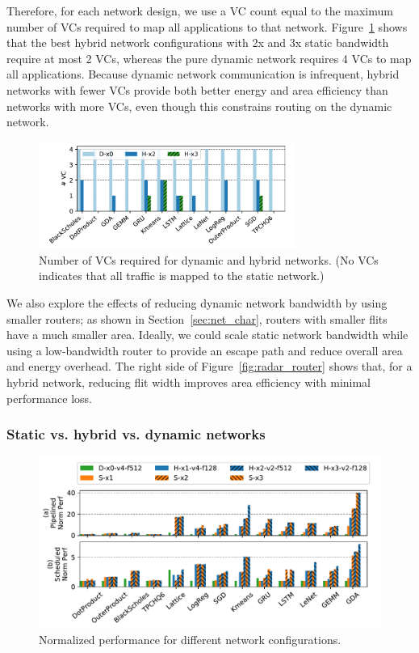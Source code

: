 Therefore, for each network design, we use a VC count equal to the maximum number of VCs required to map all applications to that network. 
Figure~\ref{fig:vc} shows that the best hybrid network configurations with 2x and 3x static bandwidth require at most 2 VCs, whereas the pure dynamic network requires 4 VCs to map all applications.
Because dynamic network communication is infrequent, hybrid networks with fewer VCs provide both better energy and area efficiency than networks with more VCs, even though this constrains routing on the dynamic network.

\begin{figure}
\centering
\includegraphics[width=0.75\textwidth]{network/figs/vc.pdf}
  \caption{Number of VCs required for dynamic and hybrid networks. (No VCs indicates that all traffic is mapped to the static network.)}\label{fig:vc}
\end{figure}

We also explore the effects of reducing dynamic network bandwidth by using smaller routers;
as shown in Section~\ref{sec:net_char}, routers with smaller flits have a much smaller area.
Ideally, we could scale static network bandwidth while using a low-bandwidth router to provide an escape path and reduce overall area and energy overhead. 
The right side of Figure~\ref{fig:radar_router} shows that, for a hybrid network, reducing flit width improves area efficiency with minimal performance loss. 

\subsubsection{Static vs. hybrid vs. dynamic networks}

\begin{figure}
\centering
\includegraphics[width=1\linewidth]{network/figs/perf.pdf}
  \caption{Normalized performance for different network configurations.}\label{fig:perf}
\end{figure}

